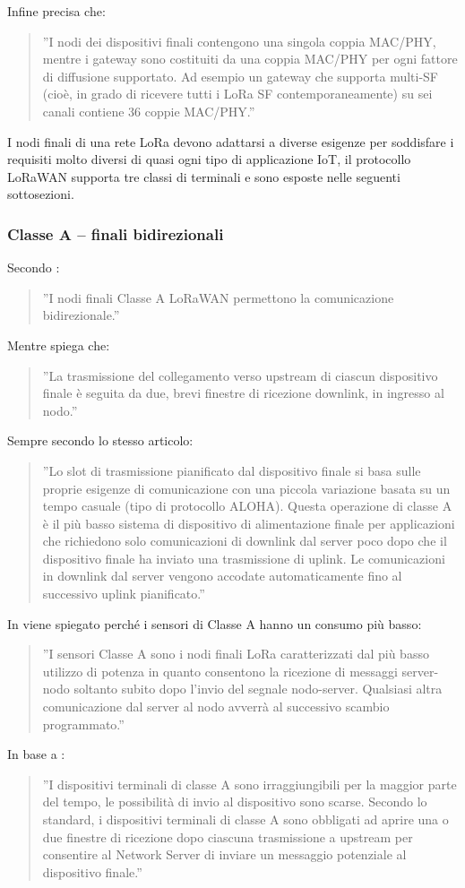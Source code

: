 \documentclass[a4paper]{report} %
\begin{document}
Infine \cite{art:rif.49} precisa che:
\begin{quote}
	''I nodi dei dispositivi finali contengono una singola coppia MAC/PHY, mentre i gateway sono costituiti da una coppia MAC/PHY per ogni fattore di diffusione supportato. Ad esempio un gateway che supporta multi-SF (cioè, in grado di ricevere tutti i LoRa SF contemporaneamente) su sei canali contiene 36 coppie MAC/PHY.''
\end{quote}
I nodi finali di una rete LoRa devono adattarsi a diverse esigenze per soddisfare i requisiti molto diversi di quasi ogni tipo di applicazione IoT, il protocollo LoRaWAN supporta tre classi di terminali e sono esposte nelle seguenti sottosezioni.

\subsubsection{Classe A – finali bidirezionali}
Secondo \cite{art:rif.27}:
\begin{quote}
	''I nodi finali Classe A LoRaWAN permettono la comunicazione bidirezionale.''  
\end{quote}
Mentre \cite{art:rif.31} spiega che:
\begin{quote}
	''La trasmissione del collegamento verso upstream di ciascun dispositivo finale è seguita da due, brevi finestre di ricezione downlink, in ingresso al nodo.''
\end{quote}
Sempre secondo lo stesso articolo:
\begin{quote}
	''Lo slot di trasmissione pianificato dal dispositivo finale si basa sulle proprie esigenze di comunicazione con una piccola variazione basata su un tempo casuale (tipo di protocollo ALOHA). Questa operazione di classe A è il più basso sistema di dispositivo di alimentazione finale per applicazioni che richiedono solo comunicazioni di downlink dal server poco dopo che il dispositivo finale ha inviato una trasmissione di uplink. Le comunicazioni in downlink dal server vengono accodate automaticamente fino al successivo uplink pianificato.'' 
\end{quote}
In \cite{art:rif.27} viene spiegato perché i sensori di Classe A hanno un consumo più basso:
\begin{quote}
	''I sensori Classe A sono i nodi finali LoRa caratterizzati dal più basso utilizzo di potenza in quanto consentono la ricezione di messaggi server-nodo soltanto subito dopo l’invio del segnale nodo-server. Qualsiasi altra comunicazione dal server al nodo avverrà al successivo scambio programmato.''  
\end{quote}
In base a \cite{art:rif.49}:
\begin{quote}
	''I dispositivi terminali di classe A sono irraggiungibili per la maggior parte del tempo, le possibilità di invio al dispositivo sono scarse. Secondo lo standard, i dispositivi terminali di classe A sono obbligati ad aprire una o due finestre di ricezione dopo ciascuna trasmissione a upstream per consentire al Network Server di inviare un messaggio potenziale al dispositivo finale.'' 
\end{quote}
\end{document}
